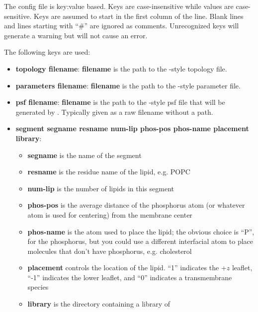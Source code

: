 \documentclass[12pt]{article}
\begin{document}
The config file is key:value based.  Keys are case-insensitive while values
are case-sensitive.  Keys are assumed to start in the first column of the
line.  Blank lines and lines starting with ``\#'' are ignored as comments.
Unrecognized keys will generate a warning but will not cause an error.

The following keys are used:

\begin{itemize}
    \item {\bf topology filename}: {\bf filename} is the path to the
                                    \namd-style topology file.
    \item {\bf parameters filename}: {\bf filename} is the path to the
                                    \namd-style parameter file.
    \item {\bf psf filename}:  {\bf filename} is the path to the \namd-style
                               psf file that will be generated by \omgwtf.
                               Typically given as a raw filename without a
                               path. 
    \item {\bf segment segname resname num-lip phos-pos phos-name placement
library}:
          \begin{itemize}
             \item {\bf segname} is the name of the segment
             \item {\bf resname} is the residue name of the lipid, e.g. POPC
             \item {\bf num-lip} is the number of lipids in this segment
             \item {\bf phos-pos} is the average distance of the phosphorus
             atom (or whatever atom is used for centering) from the membrane
center
             \item {\bf phos-name} is the atom used to place the lipid; the
                 obvious choice is ``P'', for the phosphorus, but you
                 could use a different interfacial atom to place molecules
                 that don't have phosphorus, e.g. cholesterol
             \item {\bf placement} controls the location of the lipid. ``1''
             indicates the +$z$ leaflet, ``-1'' indicates the lower leaflet,
             and ``0'' indicates a transmembrane species
             \item {\bf library} is the directory containing a library of

\end{itemize}
\end{itemize}
\end{document}
